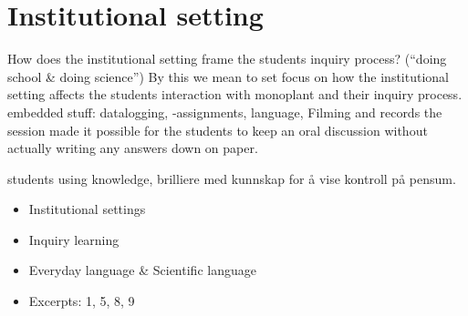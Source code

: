 \section{Institutional setting}
How does the institutional setting frame the students inquiry process? (“doing school \& doing science”)
By this we mean to set focus on how the institutional setting affects the students interaction with monoplant and their inquiry process. 
embedded stuff: datalogging, -assignments, language,
Filming and records the session made it possible for the students to keep an oral discussion without actually writing any answers down on paper. 

students using knowledge, brilliere med kunnskap for å vise kontroll på pensum.

\begin{itemize}
\item{Institutional settings}
\item{Inquiry learning}
\item{Everyday language \& Scientific language}
\item{Excerpts: 1, 5, 8, 9}
\end{itemize}
